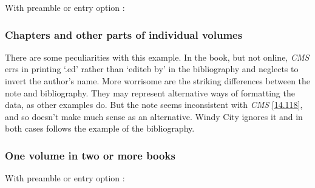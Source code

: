 \documentclass[11pt,letterpaper,oneside]{article}
\begin{document}
\noindent With preamble or entry option :

\begin{citebib}
\item \cite{armstrong2014}
\end{citebib}

\subsubsection{Chapters and other parts of individual volumes}
\label{14.120}

There are some peculiarities with this example. In the book, but not
online, \textit{CMS} errs in printing `.ed' rather than `editeb by' in
the bibliography and neglects to invert the author's name. More
worrisome are the striking differences between the note and
bibliography. They may represent alternative ways of formatting the
data, as other examples do. But the note seems inconsistent with
\textit{CMS} \ref{14.118}, and so doesn't make much sense as an
alternative. Windy City ignores it and in both cases follows the
example of the bibliography.

\begin{citebib}
\item \cite[180]{chen2010.3}
\end{citebib}

\subsubsection{One volume in two or more books}
\label{14.121}

\begin{citebib}
\item \cite[351]{lach1977}
\item \cite{harley1994}
\end{citebib}

\noindent With preamble or entry option :

\begin{citebib}
\item \cite[351]{lach1977}
\item \cite{harley1994}
\end{citebib}
\end{document}
